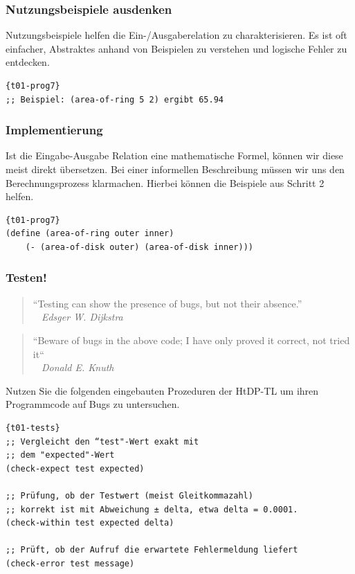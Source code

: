 \subsubsection{Nutzungsbeispiele ausdenken}
Nutzungsbeispiele helfen die Ein-/Ausgaberelation zu charakterisieren. Es ist oft einfacher, Abstraktes anhand von Beispielen zu verstehen und logische Fehler zu entdecken.

\begin{lstlisting}{t01-prog7}
;; Beispiel: (area-of-ring 5 2) ergibt 65.94
\end{lstlisting}

\subsubsection{Implementierung}
Ist die Eingabe-Ausgabe Relation eine mathematische Formel, können wir diese meist direkt übersetzen.  Bei einer informellen Beschreibung müssen wir uns den Berechnungsprozess klarmachen. Hierbei können die Beispiele aus Schritt 2 helfen.

\begin{lstlisting}{t01-prog7}
(define (area-of-ring outer inner)
	(- (area-of-disk outer) (area-of-disk inner)))
\end{lstlisting}

\subsubsection{Testen!}
\begin{quote}
	“Testing can show the presence of bugs, but not their absence.”\\
	\textit{~ Edsger W. Dijkstra}
\end{quote}
\begin{quote}
	“Beware of bugs in the above code; I have only proved it correct, not tried it“\\
	\textit{~ Donald E. Knuth}
\end{quote}

Nutzen Sie die folgenden eingebauten Prozeduren der HtDP-TL um ihren Programmcode auf Bugs zu untersuchen.
\begin{lstlisting}{t01-tests}
;; Vergleicht den “test"-Wert exakt mit
;; dem "expected"-Wert
(check-expect test expected)

;; Prüfung, ob der Testwert (meist Gleitkommazahl)
;; korrekt ist mit Abweichung ± delta, etwa delta = 0.0001.
(check-within test expected delta)

;; Prüft, ob der Aufruf die erwartete Fehlermeldung liefert
(check-error test message)
\end{lstlisting}

